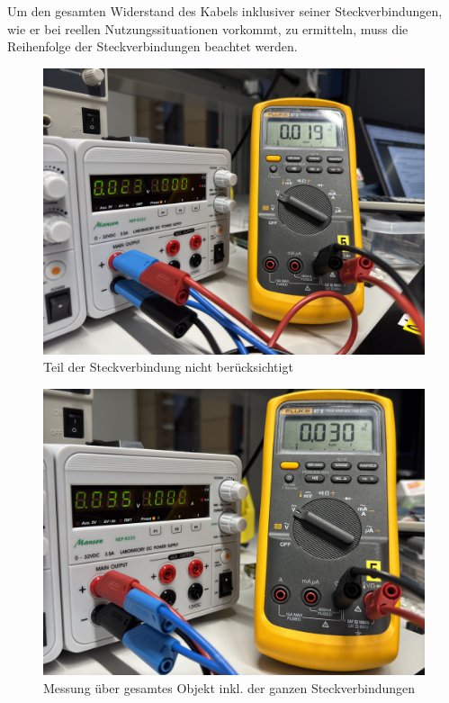 \documentclass[a4paper,12pt]{article}
\begin{document}
\noindent Um den gesamten Widerstand des Kabels inklusiver seiner Steckverbindungen, wie er bei reellen Nutzungssituationen vorkommt, zu ermitteln, muss die Reihenfolge der Steckverbindungen beachtet werden. 

\begin{figure}[H]
    \centering
    \includegraphics[width=1\textwidth]{../Quellen/Labor2/Fotos/IMG_3983.jpeg}
\caption{Teil der Steckverbindung nicht berücksichtigt}
\end{figure}

\begin{figure}[H]
    \centering
    \includegraphics[width=1\textwidth]{../Quellen/Labor2/Fotos/IMG_3982.jpeg}
\caption{Messung über gesamtes Objekt inkl. der ganzen Steckverbindungen}
\end{figure}
\end{document}
